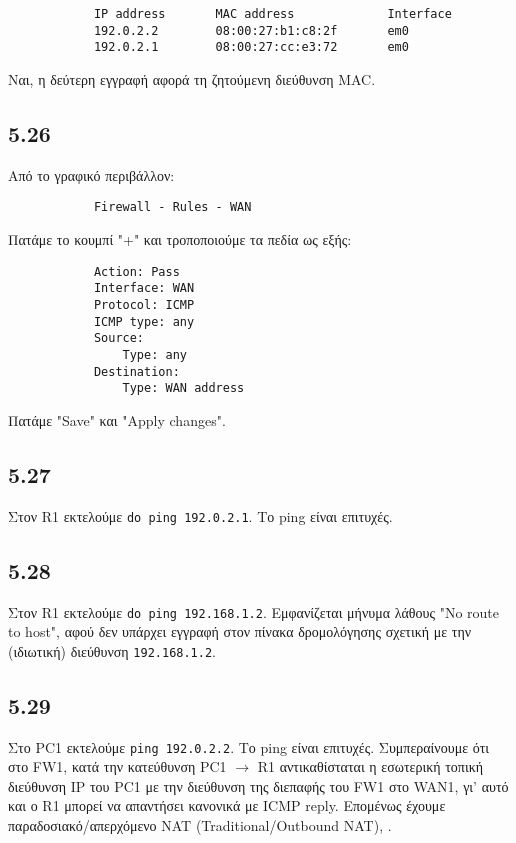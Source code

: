 \documentclass[a4paper, 12pt]{article}
\begin{document}
		\begin{verbatim}
			IP address       MAC address             Interface
			192.0.2.2        08:00:27:b1:c8:2f       em0
			192.0.2.1        08:00:27:cc:e3:72       em0
		\end{verbatim}
		
		Ναι, η δεύτερη εγγραφή αφορά τη ζητούμενη διεύθυνση MAC.

	\subsection*{5.26}
		Από το γραφικό περιβάλλον:
		
		\begin{verbatim}
			Firewall - Rules - WAN
		\end{verbatim}
		
		Πατάμε το κουμπί "+" και τροποποιούμε τα πεδία ως εξής:
		
		\begin{verbatim}
			Action: Pass
			Interface: WAN
			Protocol: ICMP
			ICMP type: any
			Source:
			    Type: any
			Destination:
			    Type: WAN address
		\end{verbatim}
		
		Πατάμε "Save" και "Apply changes".

	\subsection*{5.27}
		Στον R1 εκτελούμε \verb|do ping 192.0.2.1|. Το ping είναι επιτυχές.

	\subsection*{5.28}
		Στον R1 εκτελούμε \verb|do ping 192.168.1.2|. Εμφανίζεται μήνυμα λάθους "No route to host", αφού δεν υπάρχει εγγραφή στον πίνακα δρομολόγησης σχετική με την (ιδιωτική) διεύθυνση \verb|192.168.1.2|. 

	\subsection*{5.29}
		Στο PC1 εκτελούμε \verb|ping 192.0.2.2|. Το ping είναι επιτυχές. Συμπεραίνουμε ότι στο FW1, κατά την κατεύθυνση PC1 $\rightarrow$ R1 αντικαθίσταται η εσωτερική τοπική διεύθυνση IP του PC1 με την διεύθυνση της διεπαφής του FW1 στο WAN1, γι' αυτό και ο R1 μπορεί να απαντήσει κανονικά με ICMP reply. Επομένως έχουμε παραδοσιακό/απερχόμενο NAT (Traditional/Outbound NAT), .
\end{document}
